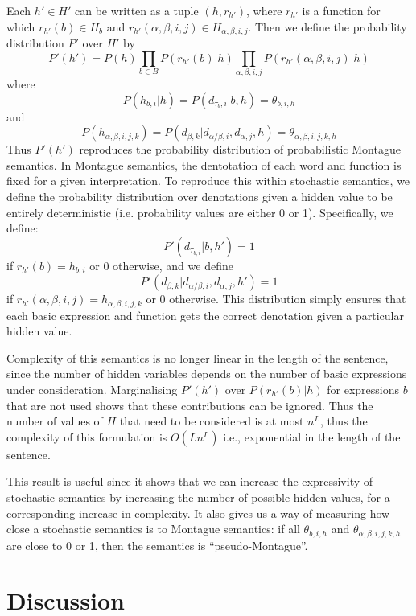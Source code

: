 \documentclass[manuscript]{clv2}
\begin{document}
Each $h'\in H'$ can be written as a tuple $(h, r_{h'})$, where
$r_{h'}$ is a function for which $r_{h'}(b) \in H_b$ and
$r_{h'}(\alpha, \beta, i, j) \in H_{\alpha, \beta, i, j}$. Then we
define the probability distribution $P'$ over $H'$ by
$$P'(h') = P(h) \prod_{b\in B} P(r_{h'}(b)|h)  \prod_{\alpha,\beta,i,j} P(r_{h'}(\alpha,\beta,i,j)|h)$$
where
$$P(h_{b,i}|h) = P(d_{\tau_b,i}|b,h) = \theta_{b,i,h}$$
and
$$P(h_{\alpha,\beta,i,j,k})=P(d_{\beta,k}|d_{\alpha/\beta,i},d_{\alpha,j},h) = \theta_{\alpha,\beta,i,j,k,h}$$
Thus $P'(h')$ reproduces the probability distribution of probabilistic
Montague semantics. In Montague semantics, the dentotation of each
word and function is fixed for a given interpretation. To reproduce
this within stochastic semantics, we define the probability
distribution over denotations given a hidden value to be entirely
deterministic (i.e. probability values are either 0 or
1). Specifically, we define:
$$P'(d_{\tau_{b,i}}|b, h') = 1$$
if $r_{h'}(b) = h_{b,i}$ or 0 otherwise, and we define
$$P'(d_{\beta,k}|d_{\alpha/\beta,i}, d_{\alpha,j},h') = 1$$
if $r_{h'}(\alpha,\beta,i,j) = h_{\alpha,\beta,i,j,k}$ or 0
otherwise. This distribution simply ensures that each basic expression
and function gets the correct denotation given a particular hidden
value.

Complexity of this semantics is no longer linear in the length of the
sentence, since the number of hidden variables depends on the number
of basic expressions under consideration. Marginalising $P'(h')$
over $P(r_{h'}(b)|h)$ for expressions $b$ that are not used shows that
these contributions can be ignored. Thus the number of values of $H$
that need to be considered is at most $n^L$, thus the complexity of
this formulation is $O(Ln^L)$ i.e., exponential in the length of the
sentence.

This result is useful since it shows that we can increase the
expressivity of stochastic semantics by increasing the number of
possible hidden values, for a corresponding increase in complexity. It
also gives us a way of measuring how close a stochastic semantics is
to Montague semantics: if all $\theta_{b,i,h}$ and
$\theta_{\alpha,\beta,i,j,k,h}$ are close to 0 or 1, then the
semantics is ``pseudo-Montague''.

\section{Discussion}
\end{document}
